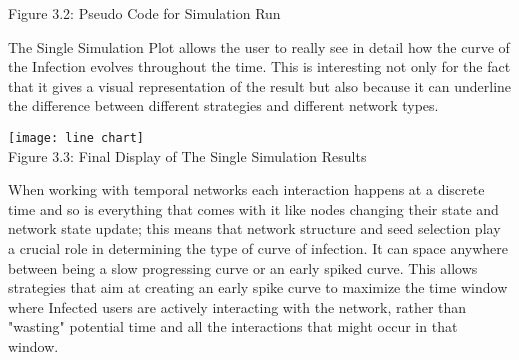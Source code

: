 \begin{center}
    Figure 3.2: Pseudo Code for Simulation Run
\end{center}

The Single Simulation Plot allows the user to really see in detail how the curve of the Infection evolves throughout the time. This is interesting not only for the fact that it gives a visual representation of the result but also because it can underline the difference between different strategies and different network types. \\

\begin{center}
    \texttt{[image: line chart]}\\
    Figure 3.3: Final Display of The Single Simulation Results
\end{center}

When working with temporal networks each interaction happens at a discrete time and so is everything that comes with it like nodes changing their state and network state update; this means that network structure and seed selection play a crucial role in determining the type of curve of infection. It can space anywhere between being a slow progressing curve or an early spiked curve. This allows strategies that aim at creating an early spike curve to maximize the time window where Infected users are actively interacting with the network, rather than "wasting" potential time and all the interactions that might occur in that window.\\


